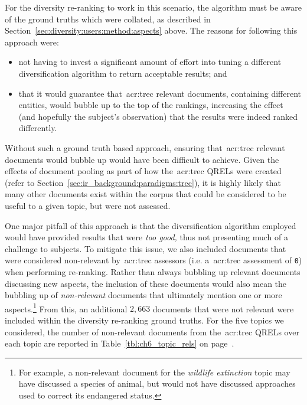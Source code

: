 For the diversity re-ranking to work in this scenario, the algorithm must be aware of the ground truths which were collated, as described in Section~\ref{sec:diversity:users:method:aspects} above. The reasons for following this approach were:

\vspace*{-2mm}
\begin{itemize}
    \item{not having to invest a significant amount of effort into tuning a different diversification algorithm to return acceptable results; and}
    \item{that it would guarantee that~\gls{acr:trec} relevant documents, containing different entities, would bubble up to the top of the rankings, increasing the effect (and hopefully the subject's observation) that the results were indeed ranked differently.}
\end{itemize}

Without such a ground truth based approach, ensuring that~\gls{acr:trec} relevant documents would bubble up would have been difficult to achieve. Given the effects of document pooling as part of how the~\gls{acr:trec} QRELs were created (refer to Section~\ref{sec:ir_background:paradigms:trec}), it is highly likely that many other documents exist within the corpus that could be considered to be useful to a given topic, but were not assessed.

One major pitfall of this approach is that the diversification algorithm employed would have provided results that were \emph{too good,} thus not presenting much of a challenge to subjects. To mitigate this issue, we also included documents that were considered non-relevant by~\gls{acr:trec} assessors (i.e. a~\gls{acr:trec} assessment of \texttt{0}) when performing re-ranking. Rather than always bubbling up relevant documents discussing new aspects, the inclusion of these documents would also mean the bubbling up of \emph{non-relevant} documents that ultimately mention one or more aspects.\footnote{For example, a non-relevant document for the \emph{wildlife extinction} topic may have discussed a species of animal, but would not have discussed approaches used to correct its endangered status.} From this, an additional $2,663$ documents that were not relevant were included within the diversity re-ranking ground truths. For the five topics we considered, the number of non-relevant documents from the~\gls{acr:trec} QRELs over each topic are reported in Table~\ref{tbl:ch6_topic_rels} on page~\pageref{tbl:ch6_topic_rels}.

